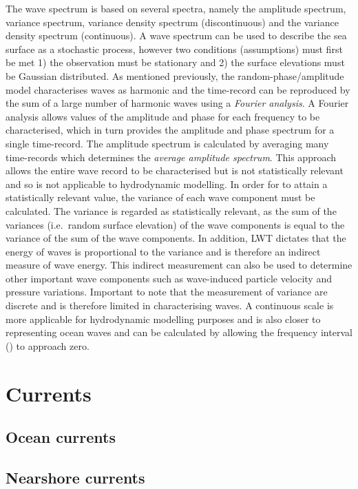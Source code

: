 \documentclass[
]{article}
\begin{document}
The wave spectrum is based on several spectra, namely the amplitude
spectrum, variance spectrum, variance density spectrum (discontinuous)
and the variance density spectrum (continuous). A wave spectrum can be
used to describe the sea surface as a stochastic process, however two
conditions (assumptions) must first be met 1) the observation must be
stationary and 2) the surface elevations must be Gaussian distributed.
As mentioned previously, the random-phase/amplitude model characterises
waves as harmonic and the time-record can be reproduced by the sum of a
large number of harmonic waves using a \emph{Fourier analysis}. A
Fourier analysis allows values of the amplitude and phase for each
frequency to be characterised, which in turn provides the amplitude and
phase spectrum for a single time-record. The amplitude spectrum is
calculated by averaging many time-records which determines the
\emph{average amplitude spectrum}. This approach allows the entire wave
record to be characterised but is not statistically relevant and so is
not applicable to hydrodynamic modelling. In order for to attain a
statistically relevant value, the variance of each wave component must
be calculated. The variance is regarded as statistically relevant, as
the sum of the variances (i.e.~random surface elevation) of the wave
components is equal to the variance of the sum of the wave components.
In addition, LWT dictates that the energy of waves is proportional to
the variance and is therefore an indirect measure of wave energy. This
indirect measurement can also be used to determine other important wave
components such as wave-induced particle velocity and pressure
variations. Important to note that the measurement of variance are
discrete and is therefore limited in characterising waves. A continuous
scale is more applicable for hydrodynamic modelling purposes and is also
closer to representing ocean waves and can be calculated by allowing the
frequency interval () to approach zero.

\hypertarget{currents}{%
\section{Currents}\label{currents}}

\hypertarget{ocean-currents}{%
\subsection{Ocean currents}\label{ocean-currents}}

\hypertarget{nearshore-currents}{%
\subsection{Nearshore currents}\label{nearshore-currents}}
\end{document}
